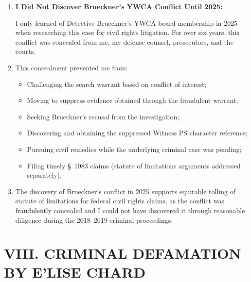 \documentclass[12pt,letterpaper]{article}
\begin{document}
\begin{enumerate}
\item \textbf{I Did Not Discover Brueckner's YWCA Conflict Until 2025:}

I only learned of Detective Brueckner's YWCA board membership in 2025 when researching this case for civil rights litigation. For over six years, this conflict was concealed from me, my defense counsel, prosecutors, and the courts.

\item This concealment prevented me from:

\begin{itemize}
\item Challenging the search warrant based on conflict of interest;
\item Moving to suppress evidence obtained through the fraudulent warrant;
\item Seeking Brueckner's recusal from the investigation;
\item Discovering and obtaining the suppressed Witness PS character reference;
\item Pursuing civil remedies while the underlying criminal case was pending;
\item Filing timely \S~1983 claims (statute of limitations arguments addressed separately).
\end{itemize}

\item The discovery of Brueckner's conflict in 2025 supports equitable tolling of statute of limitations for federal civil rights claims, as the conflict was fraudulently concealed and I could not have discovered it through reasonable diligence during the 2018--2019 criminal proceedings.

\end{enumerate}


\section*{VIII. CRIMINAL DEFAMATION BY E'LISE CHARD}
\end{document}
